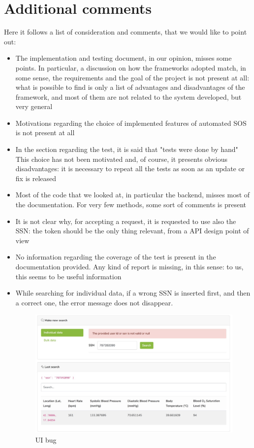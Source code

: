 \section{Additional comments}
Here it follows a list of consideration and comments, that we would like to point out:
\begin{itemize}
\item The implementation and testing document, in our opinion, misses some points. 
In particular, a discussion on how the frameworks adopted match, in some sense, the requirements and the goal of the project 
is not present at all: what is possible to find is only a list of advantages and disadvantages of the framework, and most of them are not
related to the system developed, but very general
\item Motivations regarding the choice of implemented features of automated SOS is not present at all
\item In the section regarding the test, it is said that "tests were done by hand"
This choice has not been motivated and, of course, it presents obvious disadvantages: it is necessary to repeat all the tests as soon as
an update or fix is released
\item Most of the code that we looked at, in particular the backend, misses most of the documentation. For very few methods, some sort
of comments is present
\item It is not clear why, for accepting a request, it is requested to use also the SSN: the token should be the only thing relevant, from a
API design point of view
\item No information regarding the coverage of the test is present in the documentation provided. 
Any kind of report is missing, in this sense: to us, this seems to be useful information
\item While searching for individual data, if a wrong SSN is inserted first, and then 
a correct one, the error message does not disappear. 

\begin{figure}[H]
\includegraphics[width=\linewidth]{images/bug1.png}
\caption{ UI bug }
\label{fig:bug1}
\end{figure}


\end{itemize}
